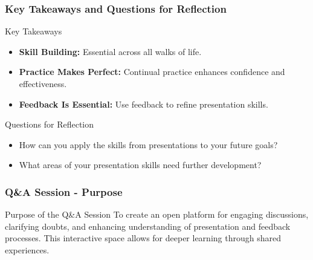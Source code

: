 \documentclass[aspectratio=169]{beamer}
\begin{document}
\begin{frame}[fragile]
    \frametitle{Key Takeaways and Questions for Reflection}
    \begin{block}{Key Takeaways}
        \begin{itemize}
            \item \textbf{Skill Building:} Essential across all walks of life.
            \item \textbf{Practice Makes Perfect:} Continual practice enhances confidence and effectiveness.
            \item \textbf{Feedback Is Essential:} Use feedback to refine presentation skills.
        \end{itemize}
    \end{block}
    
    \begin{block}{Questions for Reflection}
        \begin{itemize}
            \item How can you apply the skills from presentations to your future goals?
            \item What areas of your presentation skills need further development?
        \end{itemize}
    \end{block}
\end{frame}

\begin{frame}[fragile]
    \frametitle{Q\&A Session - Purpose}
    \begin{block}{Purpose of the Q\&A Session}
        To create an open platform for engaging discussions, clarifying doubts, and enhancing understanding of presentation and feedback processes. This interactive space allows for deeper learning through shared experiences.
    \end{block}
\end{frame}
\end{document}
